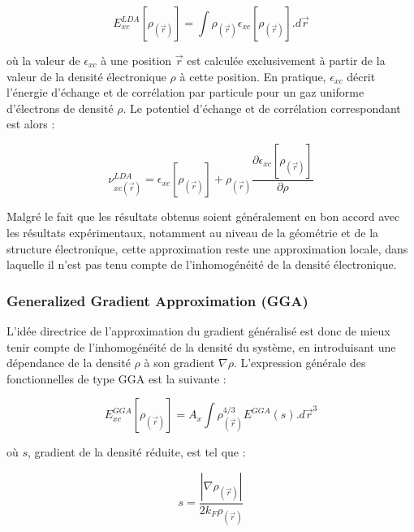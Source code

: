 \documentclass[12pt,a4paper]{book}
\begin{document}
	\begin{equation}
	E_{xc}^{LDA}[\rho_{(\vec{r})}] = \int \rho_{(\vec{r})} \epsilon_{xc}[\rho_{(\vec{r})}].d\vec{r}
	\end{equation}
	
	\noindent où la valeur de $\epsilon_{xc}$ à une position $\vec{r}$ est calculée exclusivement à partir de la valeur de la densité électronique $\rho$ à cette position. En pratique, $\epsilon_{xc}$ décrit l’énergie d’échange et de corrélation par particule pour un gaz uniforme d’électrons de densité $\rho$. Le potentiel d’échange et de corrélation correspondant est alors :
	
	\begin{equation}
	\nu_{xc(\vec{r})}^{LDA} = \epsilon_{xc}[\rho_{(\vec{r})}] + \rho_{(\vec{r})} \frac{\partial \epsilon_{xc}[\rho_{(\vec{r})}]}{\partial \rho}
	\end{equation}
	
	Malgré le fait que les résultats obtenus soient généralement en bon accord avec les résultats expérimentaux, notamment au niveau de la géométrie et de la structure électronique, cette approximation reste une approximation locale, dans laquelle il n'est pas tenu compte de l’inhomogénéité de la densité électronique.
	
	\subsubsection{Generalized Gradient Approximation (GGA)}
	
	L’idée directrice de l’approximation du gradient généralisé est donc de mieux tenir compte de l’inhomogénéité de la densité du système, en introduisant une dépendance de la densité $\rho$ à son gradient $\nabla \rho$. L’expression générale des fonctionnelles de type GGA est la suivante :
	
	\begin{equation}
	E_{xc}^{GGA}[\rho_{(\vec{r})}] = A_{x} \int \rho_{(\vec{r})}^{4/3} E^{GGA}(s) .d\vec{r}^{3}
	\end{equation}
	
	\noindent où $s$, gradient de la densité réduite, est tel que :
	
	\begin{equation}
	s = \frac{|\nabla \rho_{(\vec{r})}|}{2 k_{F} \rho_{(\vec{r})}}
	\end{equation}
	
\end{document}
